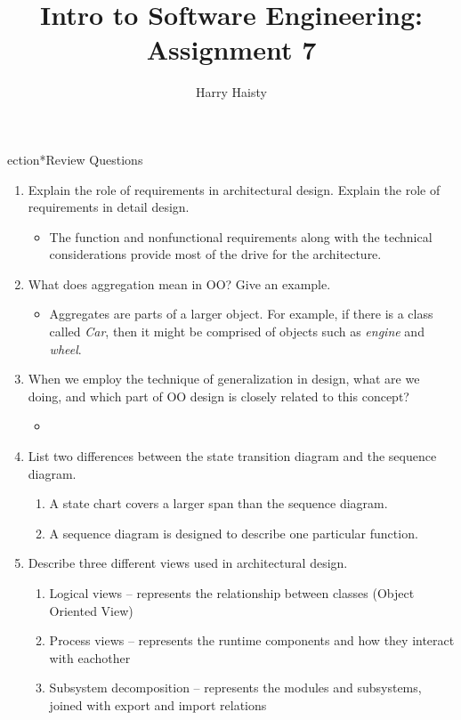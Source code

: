 \documentclass[11pt]{article}
\title{Intro to Software Engineering: Assignment 7}
\author{Harry Haisty}
\begin{document}
    \maketitle
    \s ection*{Review Questions}
    \begin{enumerate}
    
    \item Explain the role of requirements in architectural design. Explain the role of requirements in detail design. 
    \begin{itemize}
        \item[] The function and nonfunctional requirements along with the technical considerations provide most of the drive for the architecture. 
    \end{itemize}

    \item What does aggregation mean in OO? Give an example.
    \begin{itemize}
        \item[] Aggregates are parts of a larger object. For example, if there is a class called \textit{Car}, then it might be comprised of objects such as \textit{engine} 
        and \textit{wheel}.
    \end{itemize}

    \item When we employ the technique of generalization in design, what are we doing, and which part of OO design is closely related to this concept?
    \begin{itemize}
      \item[] 
    \end{itemize}

    \item List two differences between the state transition diagram and the sequence diagram.
    \begin{enumerate}
        \item[] A state chart covers a larger span than the sequence diagram.
        \item[] A sequence diagram is designed to describe one particular function.    
    \end{enumerate}
   
    \item Describe three different views used in architectural design. 
    \begin{enumerate}
        \item[] Logical views -- represents the relationship between classes (Object Oriented View)
        \item[] Process views -- represents the runtime components and how they interact with eachother
        \item[] Subsystem decomposition -- represents the modules and subsystems, joined with export and import relations
    \end{enumerate}


\end{enumerate}
\end{document}
